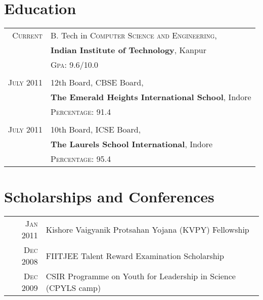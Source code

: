 \documentclass[a4paper,10pt]{article} %
\begin{document}
\section{Education}

\begin{tabular}{rl}
    \textsc{Current} & B. Tech in \textsc{Computer Science and Engineering},\\
                     & \textbf{Indian Institute of Technology}, Kanpur\\
                     & \normalsize \textsc{Gpa}: 9.6/10.0 \\
                     \\

    \textsc{July} 2011 & 12th Board, \textsc{CBSE} Board, \\
                       & \normalsize\textbf{The Emerald Heights International School}, Indore\\
                       & \normalsize \textsc{Percentage}: 91.4 \\
                       \\

    \textsc{July} 2011 & 10th Board, \textsc{ICSE} Board,  \\
                       & \normalsize\textbf{The Laurels School International}, Indore \\
                       & \normalsize \textsc{Percentage}: 95.4 \\
\end{tabular}

\section{Scholarships and Conferences}

\begin{tabular}{rl}

    \textsc{Jan} 2011 & Kishore Vaigyanik Protsahan Yojana (KVPY) Fellowship \\
    \textsc{Dec} 2008 & FIITJEE Talent Reward Examination Scholarship \\
    \textsc{Dec} 2009 & CSIR Programme on Youth for Leadership in Science (CPYLS camp) \\

\end{tabular}
\end{document}
